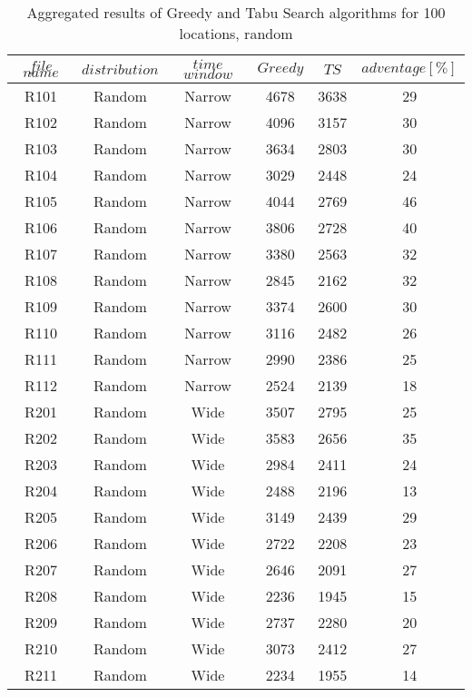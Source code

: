 \begin{table}[t]
\centering
\caption{
Aggregated results of Greedy and Tabu Search algorithms for 100 locations, random}
\begin{tabular*}{0.8\linewidth}{@{\extracolsep{\fill}}cccccc}
\toprule
$file$ $name$ & $distribution$ & $time$ $window$ & $Greedy$ & $TS$ & $adventage[\%]$ \\ \midrule
R101 & Random & Narrow & 4678 & 3638 & 29\\
R102 & Random & Narrow & 4096 & 3157 & 30\\
R103 & Random & Narrow & 3634 & 2803 & 30\\
R104 & Random & Narrow & 3029 & 2448 & 24\\
R105 & Random & Narrow & 4044 & 2769 & 46\\
R106 & Random & Narrow & 3806 & 2728 & 40\\
R107 & Random & Narrow & 3380 & 2563 & 32\\
R108 & Random & Narrow & 2845 & 2162 & 32\\
R109 & Random & Narrow & 3374 & 2600 & 30\\
R110 & Random & Narrow & 3116 & 2482 & 26\\
R111 & Random & Narrow & 2990 & 2386 & 25\\
R112 & Random & Narrow & 2524 & 2139 & 18\\
R201 & Random & Wide & 3507 & 2795 & 25\\
R202 & Random & Wide & 3583 & 2656 & 35\\
R203 & Random & Wide & 2984 & 2411 & 24\\
R204 & Random & Wide & 2488 & 2196 & 13\\
R205 & Random & Wide & 3149 & 2439 & 29\\
R206 & Random & Wide & 2722 & 2208 & 23\\
R207 & Random & Wide & 2646 & 2091 & 27\\
R208 & Random & Wide & 2236 & 1945 & 15\\
R209 & Random & Wide & 2737 & 2280 & 20\\
R210 & Random & Wide & 3073 & 2412 & 27\\
R211 & Random & Wide & 2234 & 1955 & 14\\
\end{tabular*}\end{table}